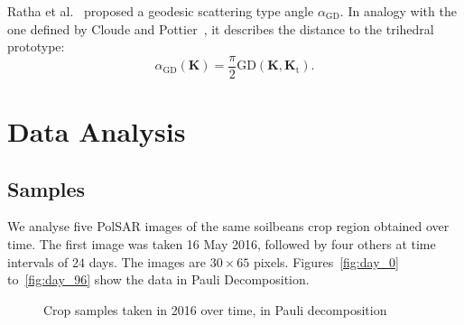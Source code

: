 \documentclass[journal]{IEEEtran}
\begin{document}
Ratha et al.~\cite{APolSARScatteringPowerFactorizationFrameworkandNovelRollInvariantParametersBasedUnsupervisedClassificationSchemeUsingaGeodesicDistanceinpress} proposed a geodesic scattering type angle $\alpha_{\text{GD}}$.
In analogy with the one defined by Cloude and Pottier~\cite{CloudePottier:97}, it describes 
the distance to the trihedral prototype:
\begin{equation}
\alpha_{\text{GD}}(\bm{K}) = \frac{\pi}{2}  \text{GD}(\bm{K},\bm{K}_{\text{t}}).
\end{equation}

\section{Data Analysis}



\subsection{Samples}

We analyse five PolSAR images of the same soilbeans crop region obtained over time. 
The first image was taken 16 May 2016, followed by four others at time intervals of $24$ days. The images are $30 \times 65$ pixels.
Figures~\ref{fig:day_0} to~\ref{fig:day_96} show the data in Pauli Decomposition. 

\begin{figure}[hbt]
  \centering
  \caption{Crop samples taken in 2016 over time, in Pauli decomposition}
  \label{fig:sample_images}
\end{figure}
\end{document}
